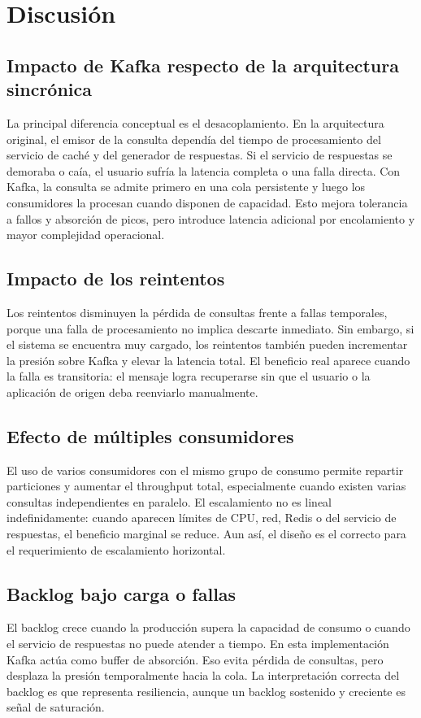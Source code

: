 \documentclass[letter,12pt]{article}
\begin{document}
\section{Discusi\'on}
\subsection{Impacto de Kafka respecto de la arquitectura sincr\'onica}
La principal diferencia conceptual es el desacoplamiento. En la arquitectura original, el emisor de la consulta depend\'ia del tiempo de procesamiento del servicio de cach\'e y del generador de respuestas. Si el servicio de respuestas se demoraba o ca\'ia, el usuario sufr\'ia la latencia completa o una falla directa. Con Kafka, la consulta se admite primero en una cola persistente y luego los consumidores la procesan cuando disponen de capacidad. Esto mejora tolerancia a fallos y absorci\'on de picos, pero introduce latencia adicional por encolamiento y mayor complejidad operacional.

\subsection{Impacto de los reintentos}
Los reintentos disminuyen la p\'erdida de consultas frente a fallas temporales, porque una falla de procesamiento no implica descarte inmediato. Sin embargo, si el sistema se encuentra muy cargado, los reintentos tambi\'en pueden incrementar la presi\'on sobre Kafka y elevar la latencia total. El beneficio real aparece cuando la falla es transitoria: el mensaje logra recuperarse sin que el usuario o la aplicaci\'on de origen deba reenviarlo manualmente.

\subsection{Efecto de m\'ultiples consumidores}
El uso de varios consumidores con el mismo grupo de consumo permite repartir particiones y aumentar el throughput total, especialmente cuando existen varias consultas independientes en paralelo. El escalamiento no es lineal indefinidamente: cuando aparecen l\'imites de CPU, red, Redis o del servicio de respuestas, el beneficio marginal se reduce. Aun as\'i, el dise\~no es el correcto para el requerimiento de escalamiento horizontal.

\subsection{Backlog bajo carga o fallas}
El backlog crece cuando la producci\'on supera la capacidad de consumo o cuando el servicio de respuestas no puede atender a tiempo. En esta implementaci\'on Kafka act\'ua como buffer de absorci\'on. Eso evita p\'erdida de consultas, pero desplaza la presi\'on temporalmente hacia la cola. La interpretaci\'on correcta del backlog es que representa resiliencia, aunque un backlog sostenido y creciente es se\~nal de saturaci\'on.
\end{document}
